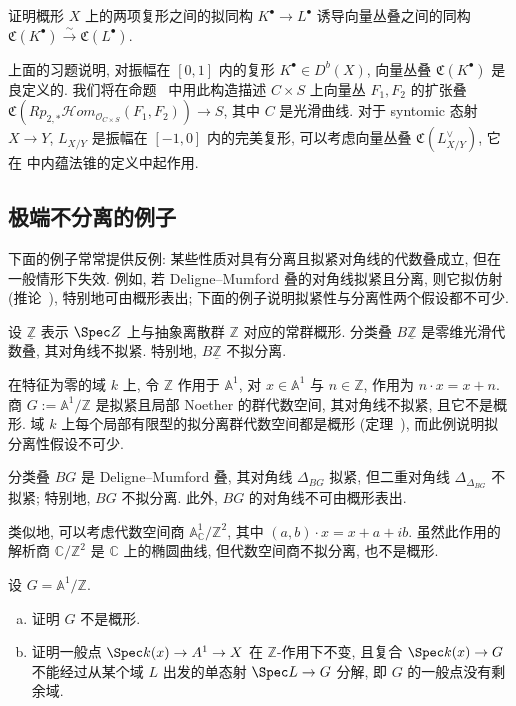 \begin{exercise}\label{src:4.9.35}
证明概形 $X$ 上的两项复形之间的拟同构 $K^\bullet\to L^\bullet$ 诱导向量丛叠之间的同构 $\mathfrak C(K^\bullet)\xrightarrow{\sim}\mathfrak C(L^\bullet)$.
\end{exercise}
上面的习题说明, 对振幅在 $[0,1]$ 内的复形 $K^\bullet\in D^b(X)$, 向量丛叠 $\mathfrak C(K^\bullet)$ 是良定义的. 我们将在命题~ 中用此构造描述 $C\times S$ 上向量丛 $F_1,F_2$ 的扩张叠 $\mathfrak C(Rp_{2,*}\mathcal H om_{\mathcal O_{C\times S}}(F_1,F_2))\to S$, 其中 $C$ 是\mbox{光滑曲线}. 对于 syntomic 态射 $X\to Y$, $L_{X/Y}$ 是振幅在 $[-1,0]$ 内的完美复形, 可以考虑向量丛叠 $\mathfrak C(L_{X/Y}^\vee)$, 它在 \cite{BF97} 中内蕴法锥的定义中起作用.

\subsection{极端不分离的例子}\label{src:4.9.4-subsection}
下面的例子常常提供反例: 某些性质对具有分离且拟紧对角线的代数叠成立, 但在一般情形下失效. 例如, 若 Deligne--Mumford 叠的对角线拟紧且分离, 则它拟仿射 (推论~), 特别地可由概形表出; 下面的例子说明拟紧性与分离性两个假设都不可少.
\begin{example}\label{src:4.9.36}
设 $\underline{\mathbb Z}$ 表示 $\Spec\mathbb Z$ 上与抽象离散群 $\mathbb Z$ 对应的常群概形. 分类叠 $B\underline{\mathbb Z}$ 是零维光滑代数叠, 其对角线不拟紧. 特别地, $B\underline{\mathbb Z}$ 不拟分离.

在特征为零的域 $k$ 上, 令 $\mathbb Z$ 作用于 $\mathbb A^1$, 对 $x\in\mathbb A^1$ 与 $n\in\mathbb Z$, 作用为 $n\cdot x=x+n$. 商 $G:=\mathbb A^1/\mathbb Z$ 是拟紧且局部 Noether 的群代数空间, 其对角线不拟紧, 且它不是概形. 域 $k$ 上每个局部有限型的拟分离群代数空间都是概形 (定理~), 而此例说明拟分离性假设不可少.

分类叠 $BG$ 是 Deligne--Mumford 叠, 其对角线 $\Delta_{BG}$ 拟紧, 但二重对角线 $\Delta_{\Delta_{BG}}$ 不拟紧; 特别地, $BG$ 不拟分离. 此外, $BG$ 的对角线不可由概形表出.

类似地, 可以考虑代数空间商 $\mathbb A^1_{\mathbb C}/\mathbb Z^2$, 其中 $(a,b)\cdot x=x+a+ib$. 虽然此作用的解析商 $\mathbb C/\mathbb Z^2$ 是 $\mathbb C$ 上的椭圆曲线, 但代数空间商不拟分离, 也不是概形.
\end{example}
\begin{exercise}\label{src:4.9.37}
设 $G=\mathbb A^1/\mathbb Z$.
\begin{enumerate}[(a)]
\item 证明 $G$ 不是概形.
\item 证明一般点 $\Spec k(x)\to\mathbb A^1\to X$ 在 $\mathbb Z$-作用下不变, 且复合 $\Spec k(x)\to G$ 不能经过从某个域 $L$ 出发的单态射 $\Spec L\to G$ 分解, 即 $G$ 的一般点没有剩余域.
\end{enumerate}
\end{exercise}
